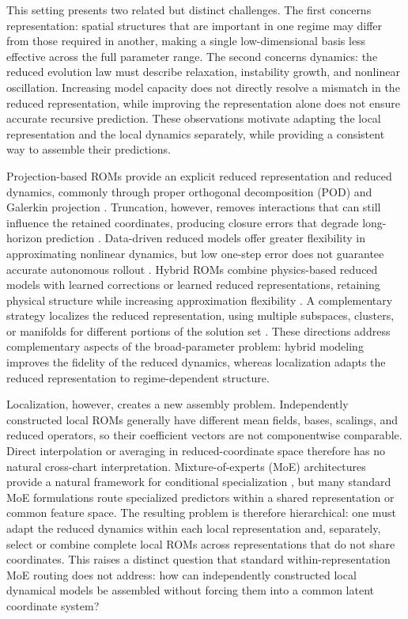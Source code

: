 \documentclass{article}
\begin{document}
This setting presents two related but distinct challenges. The first concerns representation: spatial structures that are important in one regime may differ from those required in another, making a single low-dimensional basis less effective across the full parameter range. The second concerns dynamics: the reduced evolution law must describe relaxation, instability growth, and nonlinear oscillation. Increasing model capacity does not directly resolve a mismatch in the reduced representation, while improving the representation alone does not ensure accurate recursive prediction. These observations motivate adapting the local representation and the local dynamics separately, while providing a consistent way to assemble their predictions.

Projection-based ROMs provide an explicit reduced representation and reduced dynamics, commonly through proper orthogonal decomposition (POD) and
Galerkin projection \citep{sirovich1987,berkooz1993,benner2015}. Truncation, however, removes interactions that can still influence the retained coordinates, producing closure errors that degrade long-horizon prediction \citep{amsallem2012}. Data-driven reduced models offer greater flexibility in approximating nonlinear dynamics, but low one-step error does not guarantee accurate autonomous rollout \citep{vlachas2018,duraisamy2019,brunton2020}. Hybrid ROMs combine physics-based reduced models with learned corrections or learned reduced representations, retaining physical structure while increasing approximation flexibility
\citep{dar2023,lee2020,fresca2022,geelen2023}. A complementary strategy localizes the reduced representation, using multiple subspaces, clusters, or manifolds for different portions of the solution set \citep{kaiser2014,li2021cluster,diaz2024}. These directions address complementary aspects of the broad-parameter problem: hybrid modeling improves the fidelity of the reduced dynamics, whereas localization adapts the reduced representation to regime-dependent structure.

Localization, however, creates a new assembly problem. Independently constructed local ROMs generally have different mean fields, bases, scalings, and reduced operators, so their coefficient vectors are not componentwise comparable. Direct interpolation or averaging in reduced-coordinate space therefore has no natural cross-chart interpretation. Mixture-of-experts (MoE) architectures provide a natural framework for conditional specialization \citep{jacobs1991,jordan1994,shazeer2017,fedus2022}, but many standard MoE formulations route specialized predictors within a shared representation or common feature space. The resulting problem is therefore hierarchical: one must adapt the reduced dynamics within each local representation and, separately, select or combine complete local ROMs across representations that do not share coordinates. This raises a distinct question that standard within-representation MoE routing does not address: how can independently constructed local dynamical models be assembled without forcing them into a common latent coordinate system?
\end{document}
